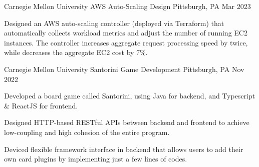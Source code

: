 \begin{cventries}
  \cventry
    {Carnegie Mellon University} %
    {AWS Auto-Scaling Design} %
    {Pittsburgh, PA} %
    {Mar 2023} %
    {
      \begin{cvitems} %
        \item {Designed an AWS auto-scaling controller (deployed via Terraform) that automatically 
        collects workload metrics and adjust the number of running EC2 instances. The controller 
        increases aggregate request processing speed by twice, while decreases the aggregate EC2 
        cost by 7\%.}
      \end{cvitems}
    }

  \cventry
    {Carnegie Mellon University} %
    {Santorini Game Development} %
    {Pittsburgh, PA} %
    {Nov 2022} %
    {
      \begin{cvitems} %
        \item {Developed a board game called Santorini, using Java for backend, and Typescript \& ReactJS for 
        frontend.}
        \item {Designed HTTP-based RESTful APIs between backend and frontend to achieve low-coupling and 
        high cohesion of the entire program.}
        \item {Deviced flexible framework interface in backend that allows users to add their own card plugins 
        by implementing just a few lines of codes.}
      \end{cvitems}
    }

\end{cventries}